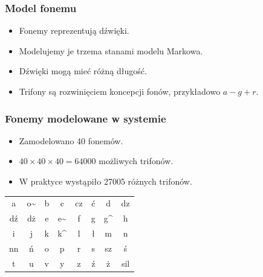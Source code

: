 \documentclass[mathserif, serif]{beamer}
\begin{document}
	\begin{frame}
		\frametitle{Model fonemu}
		
			\begin{itemize}
				\item Fonemy reprezentują dźwięki.
				\item Modelujemy je trzema stanami modelu Markowa.
				\item Dźwięki mogą mieć różną długość.
				\item Trifony są rozwinięciem koncepcji fonów, przykładowo $a-g+r$.
			\end{itemize}		
		
		\begin{figure}
		\end{figure}
	\end{frame}

	\begin{frame}
		\frametitle{Fonemy modelowane w systemie}
		
		\begin{itemize}
			\item Zamodelowano 40 fonemów.
			\item $40\times40\times40=64000$ możliwych trifonów.
			\item W praktyce wystąpiło 27005 różnych trifonów.
		\end{itemize}		
		
		\begin{table}
			\begin{tabular}{|c c c c c c c c|}
				\hline
				a  & o\~ & b & c & cz & ć & d & dz \\ 
				dź & dż & e & e\~ & f & g & g\^ & h \\
				i & j & k & k\^ & l & ł & m & n \\
				nn & ń & o & p  & r & s & sz & ś \\
				t & u & v & y & z & ź & ż & sil \\
				\hline
			\end{tabular}
		\end{table}
	\end{frame}
\end{document}
